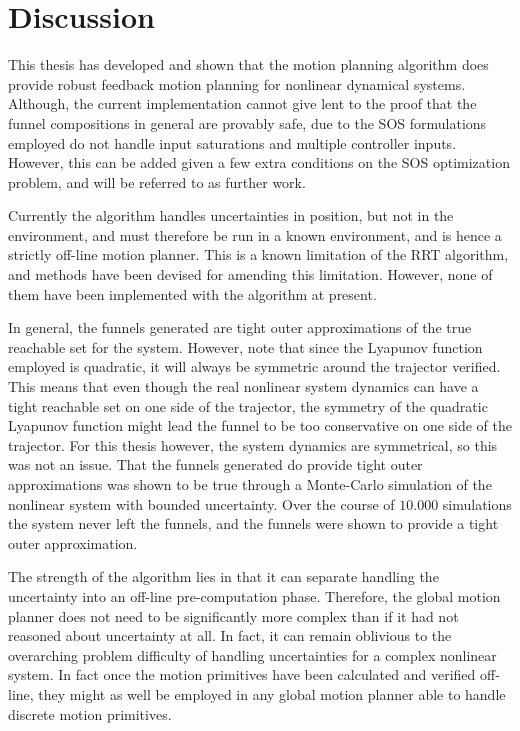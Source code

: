 \chapter{Discussion}
\label{chp:discussion}

This thesis has developed and shown that the \rrtfunnel{} motion planning
algorithm does provide robust feedback motion planning for nonlinear dynamical
systems. Although, the current implementation cannot give lent to the proof that
the funnel compositions in general are provably safe, due to the \ac{SOS}
formulations employed do not handle input saturations and multiple controller
inputs. However, this can be added given a few extra conditions on the \ac{SOS}
optimization problem, and will be referred to as further work.


Currently the algorithm handles uncertainties in position, but not in the
environment, and must therefore be run in a known environment, and is hence a
strictly off-line motion planner. This is a known limitation of the \ac{RRT}
algorithm, and methods have been devised for amending this limitation. However,
none of them have been implemented with the \rrtfunnel{} algorithm at present.


In general, the funnels generated are tight outer approximations of the true
reachable set for the system. However, note that since the Lyapunov function
employed is quadratic, it will always be symmetric around the trajector
verified. This means that even though the real nonlinear system dynamics can
have a tight reachable set on one side of the trajector, the symmetry of the
quadratic Lyapunov function might lead the funnel to be too conservative on one
side of the trajector. For this thesis however, the system dynamics are
symmetrical, so this was not an issue. That the funnels generated do provide
tight outer approximations was shown to be true through a Monte-Carlo simulation
of the nonlinear system with bounded uncertainty. Over the course of \(10.000\)
simulations the system never left the funnels, and the funnels were shown to
provide a tight outer approximation.


The strength of the algorithm lies in that it can separate handling the
uncertainty into an off-line pre-computation phase. Therefore, the global motion
planner does not need to be significantly more complex than if it had not
reasoned about uncertainty at all. In fact, it can remain oblivious to the
overarching problem difficulty of handling uncertainties for a complex nonlinear
system. In fact once the motion primitives have been calculated and verified
off-line, they might as well be employed in any global motion planner able to
handle discrete motion primitives.


